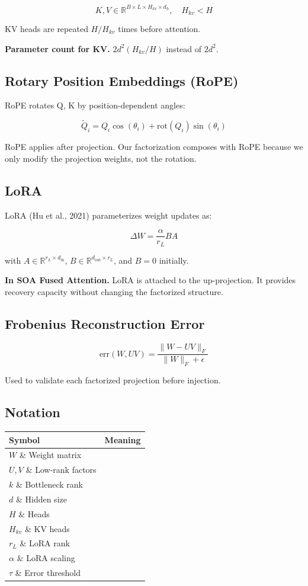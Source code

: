 \[
K, V \in \mathbb{R}^{B \times L \times H_{kv} \times d_h}, \quad
H_{kv} < H
\]

KV heads are repeated $H / H_{kv}$ times before attention.

\textbf{Parameter count for KV.} $2 d^2 (H_{kv} / H)$ instead of $2 d^2$.

\subsection{Rotary Position Embeddings (RoPE)}

RoPE rotates Q, K by position-dependent angles:

\[
\tilde{Q}_i = Q_i \cos(\theta_i) + \text{rot}(Q_i) \sin(\theta_i)
\]

RoPE applies after projection. Our factorization composes with RoPE because 
we only modify the projection weights, not the rotation.

\subsection{LoRA}

LoRA (Hu et al., 2021) parameterizes weight updates as:

\[
\Delta W = \frac{\alpha}{r_L} B A
\]

with $A \in \mathbb{R}^{r_L \times d_\text{in}}$, $B \in \mathbb{R}^{d_\text{out} \times r_L}$, 
and $B = 0$ initially.

\textbf{In SOA Fused Attention.} LoRA is attached to the up-projection. It 
provides recovery capacity without changing the factorized structure.

\subsection{Frobenius Reconstruction Error}

\[
\text{err}(W, UV) = \frac{\|W - UV\|_F}{\|W\|_F + \epsilon}
\]

Used to validate each factorized projection before injection.

\subsection{Notation}

\begin{table}[H]
\centering
\small
\begin{tabular}{ll}
\toprule
\textbf{Symbol} & \textbf{Meaning} \\
\midrule
$W$ \& Weight matrix \\
$U, V$ \& Low-rank factors \\
$k$ \& Bottleneck rank \\
$d$ \& Hidden size \\
$H$ \& Heads \\
$H_{kv}$ \& KV heads \\
$r_L$ \& LoRA rank \\
$\alpha$ \& LoRA scaling \\
$\tau$ \& Error threshold \\
\bottomrule
\end{tabular}
\end{table}


